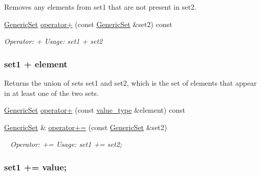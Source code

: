 \begin{DoxyCompactItemize}
\begin{DoxyCompactList}
Removes any elements from {\ttfamily set1} that are not present in {\ttfamily set2}. \end{DoxyCompactList}\item 
\mbox{\hyperlink{classstanfordcpplib_1_1collections_1_1GenericSet}{Generic\+Set}} \mbox{\hyperlink{classstanfordcpplib_1_1collections_1_1GenericSet_afea3af6c9d038b2965e152623d790723}{operator+}} (const \mbox{\hyperlink{classstanfordcpplib_1_1collections_1_1GenericSet}{Generic\+Set}} \&set2) const
\begin{DoxyCompactList}\small\item\em Operator\+: + Usage\+: set1 + set2 \subsubsection*{set1 + element }

Returns the union of sets {\ttfamily set1} and {\ttfamily set2}, which is the set of elements that appear in at least one of the two sets. \end{DoxyCompactList}\item 
\mbox{\hyperlink{classstanfordcpplib_1_1collections_1_1GenericSet}{Generic\+Set}} \mbox{\hyperlink{classstanfordcpplib_1_1collections_1_1GenericSet_afa15583f3e2d538799d56f6ac04608b9}{operator+}} (const \mbox{\hyperlink{classstanfordcpplib_1_1collections_1_1GenericSet_a669c81f158766925e7293f97c0099b28}{value\+\_\+type}} \&element) const
\item 
\mbox{\hyperlink{classstanfordcpplib_1_1collections_1_1GenericSet}{Generic\+Set}} \& \mbox{\hyperlink{classstanfordcpplib_1_1collections_1_1GenericSet_af79734e82170dc5c5c9304a9d1898d57}{operator+=}} (const \mbox{\hyperlink{classstanfordcpplib_1_1collections_1_1GenericSet}{Generic\+Set}} \&set2)
\begin{DoxyCompactList}\small\item\em ~\newline
 Operator\+: += Usage\+: set1 += set2; \subsubsection*{set1 += value; }


\end{DoxyCompactList}
\end{DoxyCompactItemize}

